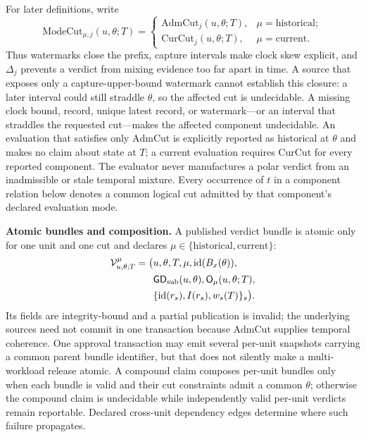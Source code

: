 For later definitions, write
\[
\mathrm{ModeCut}_{\mu,j}(u,\theta;T)=
\begin{cases}
\mathrm{AdmCut}_j(u,\theta;T),&\mu=\mathrm{historical};\\
\mathrm{CurCut}_j(u,\theta;T),&\mu=\mathrm{current}.
\end{cases}
\]
Thus watermarks close the prefix, capture intervals make clock skew explicit,
and $\Delta_j$ prevents a verdict from mixing evidence too far apart in time.
A source that exposes only a capture-upper-bound watermark cannot establish
this closure: a later interval could still straddle $\theta$, so the affected
cut is undecidable.
A missing clock bound, record, unique latest record, or watermark---or an
interval that straddles the requested cut---makes the affected component
undecidable. An evaluation that satisfies only $\mathrm{AdmCut}$ is explicitly
reported as historical at $\theta$ and makes no claim about state at $T$; a
current evaluation requires $\mathrm{CurCut}$ for every reported component.
The evaluator never manufactures a polar verdict from an inadmissible or stale
temporal mixture. Every occurrence of $t$ in a component relation below
denotes a common logical cut admitted by that component's declared evaluation
mode.

\textbf{Atomic bundles and composition.} A published verdict bundle is
atomic only for one unit and one cut and declares
$\mu\in\{\mathrm{historical},\mathrm{current}\}$:
\[
\begin{aligned}
\mathcal V^{\mu}_{u,\theta;T}=\bigl(&u,\theta,T,\mu,
\mathrm{id}(B_x(\theta)),\\
&\mathsf{GD}_{\mathrm{sub}}(u,\theta),\mathsf{O}_{\mu}(u,\theta;T),\\
&\{\mathrm{id}(r_s),I(r_s),w_s(T)\}_{s}\bigr).
\end{aligned}
\]
Its fields are integrity-bound and a partial publication is invalid; the
underlying sources need not commit in one transaction because
$\mathrm{AdmCut}$ supplies temporal coherence. One approval transaction may
emit several per-unit snapshots carrying a common parent bundle identifier,
but that does not silently make a multi-workload release atomic. A compound
claim composes per-unit bundles only when each bundle is valid and their cut
constraints admit a common $\theta$; otherwise the compound claim is
undecidable while independently valid per-unit verdicts remain reportable.
Declared cross-unit dependency edges determine where such failure propagates.

